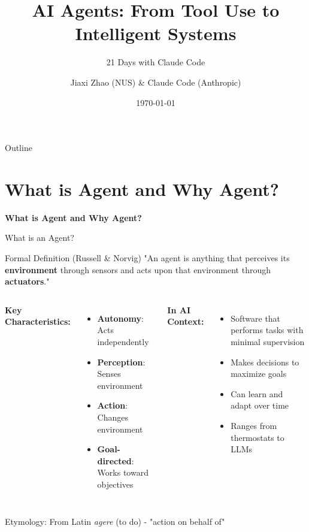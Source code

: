 \documentclass[aspectratio=169]{beamer}
\title[AI Agents]{AI Agents: From Tool Use to Intelligent Systems}
\subtitle{21 Days with Claude Code}
\author[J. Zhao \& CC]{Jiaxi Zhao (NUS) \& Claude Code (Anthropic)}
\date[\today]{\today}
\begin{document}
\begin{frame}
\titlepage
\end{frame}

\begin{frame}{Outline}
\tableofcontents
\end{frame}

\section{What is Agent and Why Agent?}

\begin{frame}
	\begin{center}
		\Large
		\textbf{What is Agent and Why Agent?}
	\end{center}
\end{frame}

\begin{frame}{What is an Agent?}
	\begin{block}{Formal Definition (Russell \& Norvig)}
		"An agent is anything that perceives its \textbf{environment} through sensors and acts upon that environment through \textbf{actuators}."
	\end{block}
	
	\vspace{0.3cm}
	
	\begin{columns}
		\textbf{Key Characteristics:}
		\begin{itemize}
			\item {\color{highlight}\textbf{Autonomy}}: Acts independently
			\item {\color{highlight}\textbf{Perception}}: Senses environment
			\item {\color{highlight}\textbf{Action}}: Changes environment
			\item {\color{highlight}\textbf{Goal-directed}}: Works toward objectives
		\end{itemize}
		
		\textbf{In AI Context:}
		\begin{itemize}
			\item Software that performs tasks with minimal supervision
			\item Makes decisions to maximize goals
			\item Can learn and adapt over time
			\item Ranges from thermostats to LLMs
		\end{itemize}
	\end{columns}
	
	\vspace{0.3cm}
	
	\begin{center}
		\small
		{\color{gray}Etymology: From Latin \textit{agere} (to do) - "action on behalf of"}
	\end{center}
\end{frame}
\end{document}
